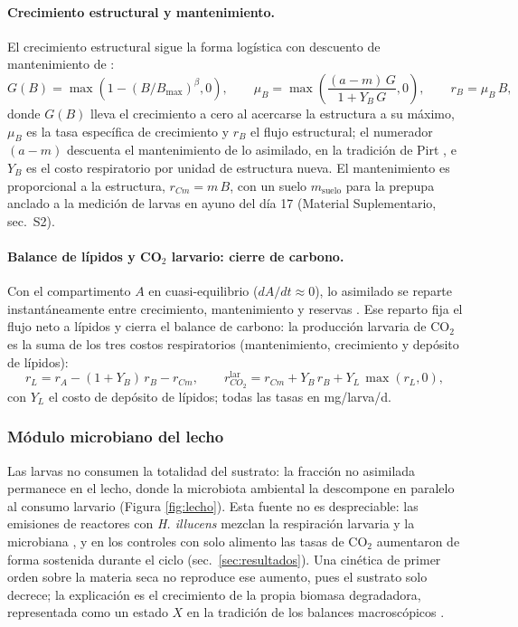 \paragraph{Crecimiento estructural y mantenimiento.}
El crecimiento estructural sigue la forma logística con descuento de mantenimiento de \textcite{eriksenDynamicModellingFeed2022}:
\begin{equation}
G(B) = \max\!\left(1 - (B/B_{\max})^{\beta}, 0\right),
\qquad
\mu_B = \max\!\left(\frac{(a - m)\,G}{1 + Y_B\,G}, 0\right),
\qquad r_B = \mu_B\,B,
\label{eq:crecimiento}
\end{equation}
donde $G(B)$ lleva el crecimiento a cero al acercarse la estructura a su máximo, $\mu_B$ es la tasa específica de crecimiento y $r_B$ el flujo estructural; el numerador $(a - m)$ descuenta el mantenimiento de lo asimilado, en la tradición de Pirt \parencite{roels1980}, e $Y_B$ es el costo respiratorio por unidad de estructura nueva. El mantenimiento es proporcional a la estructura, $r_{Cm} = m\,B$, con un suelo $m_{\mathrm{suelo}}$ para la prepupa anclado a la medición de larvas en ayuno del día 17 (Material Suplementario, sec.~S2).

\paragraph{Balance de lípidos y CO$_2$ larvario: cierre de carbono.}
Con el compartimento $A$ en cuasi-equilibrio ($dA/dt \approx 0$), lo asimilado se reparte instantáneamente entre crecimiento, mantenimiento y reservas \parencite{eriksenDynamicModellingFeed2022,eriksenMetabolicPerformanceFeed2024}. Ese reparto fija el flujo neto a lípidos y cierra el balance de carbono: la producción larvaria de CO$_2$ es la suma de los tres costos respiratorios (mantenimiento, crecimiento y depósito de lípidos):
\begin{equation}
r_L = r_A - (1 + Y_B)\,r_B - r_{Cm},
\qquad
r_{CO_2}^{\mathrm{lar}} = r_{Cm} + Y_B\,r_B + Y_L\,\max(r_L, 0),
\label{eq:co2lar}
\end{equation}
con $Y_L$ el costo de depósito de lípidos; todas las tasas en mg/larva/d.

\subsubsection{Módulo microbiano del lecho}
Las larvas no consumen la totalidad del sustrato: la fracción no asimilada permanece en el lecho, donde la microbiota ambiental la descompone en paralelo al consumo larvario (Figura \ref{fig:lecho}). Esta fuente no es despreciable: las emisiones de reactores con \textit{H. illucens} mezclan la respiración larvaria y la microbiana \parencite{ermolaevGreenhouseGasEmissions2019,parodiBioconversionEfficienciesGreenhouse2020a}, y en los controles con solo alimento las tasas de CO$_2$ aumentaron de forma sostenida durante el ciclo (sec.~\ref{sec:resultados}). Una cinética de primer orden sobre la materia seca no reproduce ese aumento, pues el sustrato solo decrece; la explicación es el crecimiento de la propia biomasa degradadora, representada como un estado $X$ en la tradición de los balances macroscópicos \parencite{roels1980,shulerbioprocess2017}.

